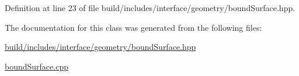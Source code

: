 Definition at line 23 of file build/includes/interface/geometry/bound\+Surface.\+hpp.



The documentation for this class was generated from the following files\+:\begin{DoxyCompactItemize}
\item 
\hyperlink{build_2includes_2interface_2geometry_2boundSurface_8hpp}{build/includes/interface/geometry/bound\+Surface.\+hpp}\item 
\hyperlink{boundSurface_8cpp}{bound\+Surface.\+cpp}\end{DoxyCompactItemize}
